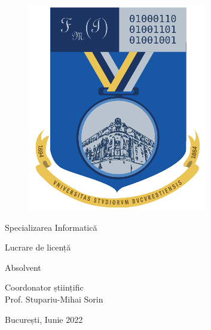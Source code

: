 \documentclass[a4paper, 12pt]{report}
\begin{document}
\begin{titlepage}
\begin{figure}[!htb]
\begin{minipage}{0.21\textwidth}
        \includegraphics[width=\linewidth]{img/FMI_Logo.png}
    \end{minipage}
    \end{figure}

    \begin{center}
        Specializarea Informatică
    \end{center}

    \vspace{0.5cm}

    \begin{center}
        {\Large Lucrare de licență}
    \end{center}

    \begin{center}
        {\huge \@title}
    \end{center}

    \vspace{2.8cm}

    \begin{center}
        \large Absolvent \\ \@author
    \end{center}

    \vspace{0.25cm}

    \begin{center}
        \large Coordonator științific \\ Prof. Stupariu-Mihai Sorin
    \end{center}

    \vspace{2cm}

    \begin{center}
        \Large București, Iunie 2022
    \end{center}
\end{titlepage}
\end{document}
